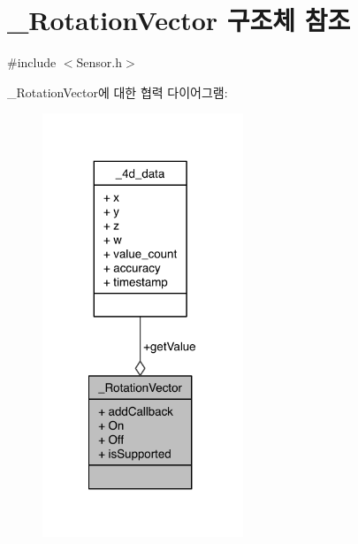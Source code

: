\hypertarget{struct___rotation_vector}{\section{\-\_\-\-Rotation\-Vector 구조체 참조}
\label{struct___rotation_vector}
}


{\ttfamily \#include $<$Sensor.\-h$>$}



\-\_\-\-Rotation\-Vector에 대한 협력 다이어그램\-:
\nopagebreak
\begin{figure}[H]
\begin{center}
\leavevmode
\includegraphics[width=170pt]{db/d00/struct___rotation_vector__coll__graph}
\end{center}
\end{figure}
